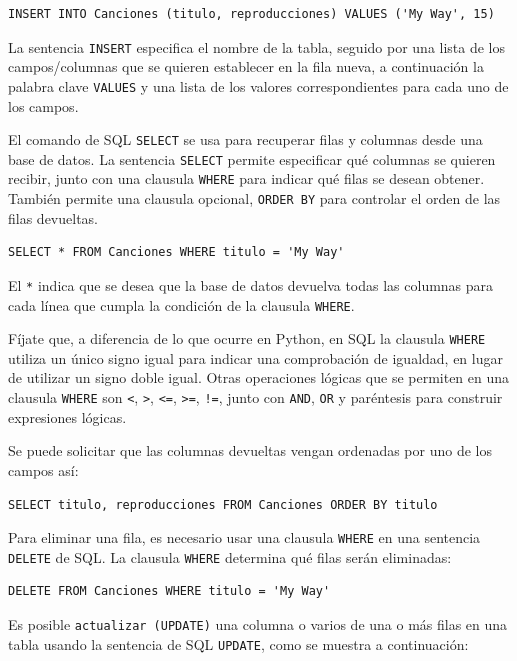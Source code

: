 \beforeverb
\begin{verbatim}
INSERT INTO Canciones (titulo, reproducciones) VALUES ('My Way', 15)
\end{verbatim}
\afterverb
%
La sentencia {\tt INSERT} especifica el nombre de la tabla, seguido por una lista
de los campos/columnas que se quieren establecer en la fila nueva, a continuación
la palabra clave {\tt VALUES} y una lista de los valores correspondientes
para cada uno de los campos.

El comando de SQL {\tt SELECT} se usa para recuperar filas y columnas desde una base de datos.
La sentencia {\tt SELECT} permite especificar qué columnas se quieren
recibir, junto con una clausula {\tt WHERE} para indicar qué 
filas se desean obtener. También permite una clausula opcional,
{\tt ORDER BY} para controlar el orden de las filas devueltas.

\beforeverb
\begin{verbatim}
SELECT * FROM Canciones WHERE titulo = 'My Way'
\end{verbatim}
\afterverb
%
El \verb"*" indica que se desea que la base de datos devuelva todas las
columnas para cada línea que cumpla la condición de la clausula {\tt WHERE}.

Fíjate que, a diferencia de lo que ocurre en Python, en SQL la clausula {\tt WHERE}
utiliza un único signo igual
para indicar una comprobación de igualdad, en lugar de utilizar un signo doble igual.
Otras operaciones lógicas que se permiten en una clausula {\tt WHERE} son
\verb"<",
\verb">",
\verb"<=",
\verb">=",
\verb"!=",
junto con {\tt AND}, {\tt OR} y paréntesis
para construir expresiones lógicas.

Se puede solicitar que las columnas devueltas vengan ordenadas por uno
de los campos así:

\beforeverb
\begin{verbatim}
SELECT titulo, reproducciones FROM Canciones ORDER BY titulo
\end{verbatim}
\afterverb
%
Para eliminar una fila, es necesario usar una clausula {\tt WHERE} en una sentencia
{\tt DELETE} de SQL. La clausula {\tt WHERE} determina qué filas serán eliminadas:

\beforeverb
\begin{verbatim}
DELETE FROM Canciones WHERE titulo = 'My Way'
\end{verbatim}
\afterverb
%
Es posible {\tt actualizar (UPDATE)} una columna o varios de una o más filas
en una tabla usando la sentencia de SQL {\tt UPDATE}, como se muestra a continuación:

